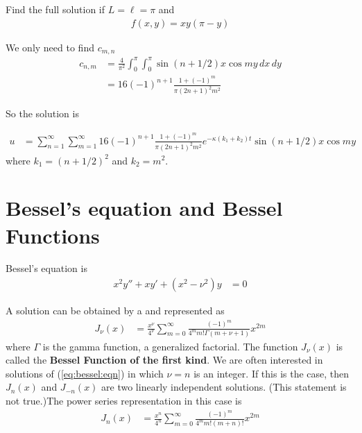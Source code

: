 \begin{example}
Find the full solution if $L=\ell=\pi$ and
%
\begin{align*}
f(x,y) = x y (\pi-y)
\end{align*}

\solution

We only need to find $c_{m,n}$
%
\begin{align*}
c_{n,m} & =\frac{4}{\pi^2} \int_0^{\pi}\int_0^{\pi} \sin (n+1/2) x \cos my  \, dx \, dy\\
& = 16 (-1)^{n+1} {\frac {1+(-1)^m}{{\pi } (2n+1)^2 {m}^{2}}}
\end{align*}

So the solution is

\begin{align*}
u & = \sum_{n=1}^{\infty} \sum_{m=1}^{\infty} 16 (-1)^{n+1} {\frac {1+(-1)^m}{{\pi } (2n+1)^2 {m}^{2}}}    e^{-\kappa(k_1+k_2)t}\sin (n+1/2)  x\cos my
\end{align*}
where
$k_1= (n+1/2)^2$ and $k_2=m^2$.
\end{example}


\section{Bessel's equation and Bessel Functions}

\label{sect:bessel:functions}

Bessel's equation is
%
\begin{align} \label{eq:bessel:eqn}
x^2 y'' + x y' + (x^2-\nu^2)y & = 0
\end{align}

A solution can be obtained by a  and represented as
%
\begin{align*}
J_{\nu} (x) & = \frac{x^{\nu}}{4^{\nu}} \sum_{m=0}^{\infty} \frac{(-1)^m}{4^m m! \Gamma(m+\nu+1)} x^{2m}
\end{align*}
where $\Gamma$ is the gamma function, a generalized factorial.   The function $J_{\nu}(x)$ is called the \textbf{Bessel Function of the first kind}.    We are often interested in solutions of (\ref{eq:bessel:eqn}) in which $\nu=n$ is an integer.  {\color{red} If this is the case, then $J_n(x)$ and $J_{-n}(x)$ are two linearly independent solutions.  (This statement is not true.)}The power series representation in this case is
%
\begin{align} \label{eq:bessel:function:power:series}
J_{n} (x) & = \frac{x^{n}}{4^{n}} \sum_{m=0}^{\infty} \frac{(-1)^m}{4^m m! (m+n)!} x^{2m}
\end{align}

